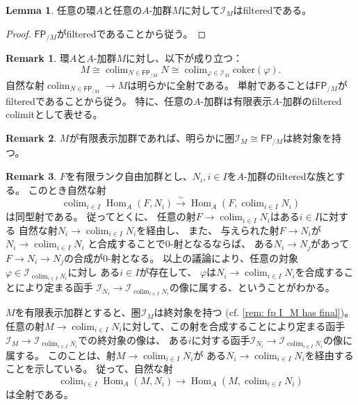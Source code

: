 \documentclass[uplatex]{jsarticle}
\theoremstyle{definition}
\newtheorem{lem}[lem]{Lemma}
\newtheorem{rem}[rem]{Remark}
\DeclareMathOperator{\Hom}{Hom}
\newcommand{\coker}{\mathrm{coker}}
\DeclareMathOperator{\colim}{\mathrm{colim}}
\newcommand{\FP}[1]{\mathsf{FP}_{/#1}}
\newcommand{\mcI}{\mathcal{I}}
\begin{document}
\begin{lem}\label{lem: I_M filtered}
  任意の環\(A\)と任意の\(A\)-加群\(M\)に対して\(\mcI_M\)はfilteredである。
\end{lem}

\begin{proof}
  \(\FP{M}\)がfilteredであることから従う。
\end{proof}


\begin{rem}
  環\(A\)と\(A\)-加群\(M\)に対し、以下が成り立つ：
  \[
  M\cong \colim_{N\in \FP{M}} N
  \cong \colim_{\varphi\in \mcI_M}\coker(\varphi).
  \]
  自然な射\(\colim_{N\in\FP{M}}\to M\)は明らかに全射である。
  単射であることは\(\FP{M}\)がfilteredであることから従う。
  特に、任意の\(A\)-加群は有限表示\(A\)-加群のfiltered colimitとして表せる。
\end{rem}


\begin{rem}\label{rem: fp I_M has final}
  \(M\)が有限表示加群であれば、明らかに圏\(\mcI_M\cong \FP{M}\)は終対象を持つ。
\end{rem}


\begin{rem}\label{rem: fp colim surj}
  \(F\)を有限ランク自由加群とし、\(N_i,i\in I\)を\(A\)-加群のfilteredな族とする。
  このとき自然な射
  \[
  \colim_{i\in I}\Hom_A(F,N_i) \xrightarrow{\sim} \Hom_A(F,\colim_{i\in I}N_i)
  \]
  は同型射である。
  従ってとくに、
  任意の射\(F\to \colim_{i\in I}N_i\)はある\(i\in I\)に対する
  自然な射\(N_i\to \colim_{i\in I}N_i\)を経由し、
  また、
  与えられた射\(F\to N_i\)が\(N_i\to \colim_{i\in I}N_i\)
  と合成することで\(0\)-射となるならば、
  ある\(N_i\to N_j\)があって\(F\to N_i\to N_j\)の合成が\(0\)-射となる。
  以上の議論により、任意の対象\(\varphi\in \mcI_{\colim_{i\in I}N_i}\)に対し
  ある\(i\in I\)が存在して、
  \(\varphi\)は\(N_i\to \colim_{i\in I}N_i\)を合成することにより定まる函手
  \(\mcI_{N_i}\to \mcI_{\colim_{i\in I}N_i}\)の像に属する、ということがわかる。

  \(M\)を有限表示加群とすると、圏\(\mcI_M\)は終対象を持つ
  (cf. \autoref{rem: fp I_M has final})。
  任意の射\(M\to \colim_{i\in I}N_i\)に対して、この射を合成することにより定まる函手
  \(\mcI_M\to \mcI_{\colim_{i\in I}N_i}\)での終対象の像は、
  ある\(i\)に対する函手\(\mcI_{N_i}\to \mcI_{\colim_{i\in I}N_i}\)の像に属する。
  このことは、射\(M\to \colim_{i\in I}N_i\)が
  ある\(N_i\to \colim_{i\in I}N_i\)を経由することを示している。
  従って、自然な射
  \[
  \colim_{i\in I}\Hom_A(M,N_i)\to \Hom_A(M,\colim_{i\in I}N_i)
  \]
  は全射である。
\end{rem}
\end{document}
